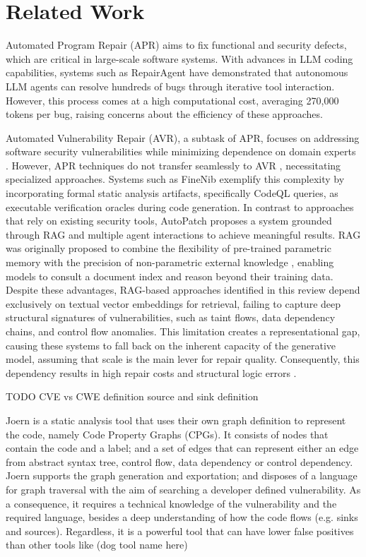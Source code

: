 \documentclass[11pt, a4paper]{article}
\begin{document}
\section*{Related Work}
Automated Program Repair (APR) aims to fix functional and security defects, which are critical in large-scale software systems.
With advances in LLM coding capabilities, systems such as RepairAgent \cite{bouzenia2025repairagent} have demonstrated that autonomous LLM agents can resolve hundreds of bugs through iterative tool interaction.
However, this process comes at a high computational cost, averaging 270,000 tokens per bug, raising concerns about the efficiency of these approaches.

Automated Vulnerability Repair (AVR), a subtask of APR, focuses on addressing software security vulnerabilities while minimizing dependence on domain experts \cite{vulrepair2025usenix}.
However, APR techniques do not transfer seamlessly to AVR \cite{pinconshi2021comparativeaprvul}, necessitating specialized approaches.
Systems such as FineNib \cite{wang2026finenib} exemplify this complexity by incorporating formal static analysis artifacts, specifically CodeQL queries, as executable verification oracles during code generation. 
In contrast to approaches that rely on existing security tools, AutoPatch \cite{seo2026autopatch} proposes a system grounded through RAG and multiple agent interactions to achieve meaningful results. 
RAG was originally proposed to combine the flexibility of pre-trained parametric memory with the precision of non-parametric external knowledge \cite{lewis2020rag}, enabling models to consult a document index and reason beyond their training data.
Despite these advantages, RAG-based approaches identified in this review depend exclusively on textual vector embeddings for retrieval, failing to capture deep structural signatures of vulnerabilities, such as taint flows, data dependency chains, and control flow anomalies. 
This limitation creates a representational gap, causing these systems to fall back on the inherent capacity of the generative model, assuming that scale is the main lever for repair quality.
Consequently, this dependency results in high repair costs and structural logic errors \cite{cao2024cutting}.

TODO
CVE vs CWE definition 
source and sink definition

Joern \cite{joern} is a static analysis tool that uses their own graph definition to represent the code, namely Code Property Graphs (CPGs). 
It consists of nodes that contain the code and a label; and a set of edges that can represent either an edge from abstract syntax tree, control flow, data dependency or control dependency.
Joern supports the graph generation and exportation; and disposes of a language for graph traversal with the aim of searching a developer defined vulnerability.
As a consequence, it requires a technical knowledge of the vulnerability and the required language, besides a deep understanding of how the code flows (e.g. sinks and sources).
Regardless, it is a powerful tool that can have lower false positives than other tools like (dog tool name here)  
\end{document}
